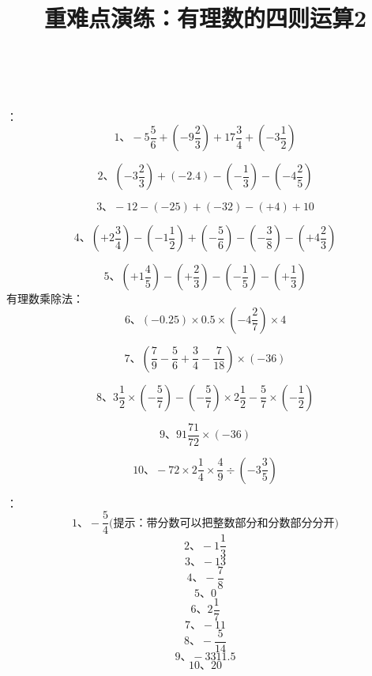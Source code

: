 \documentclass[fleqn]{article}
\title{重难点演练：有理数的四则运算2}
\date{}
\begin{document}
  \hspace{4cm}{\Large 重难点演练：有理数的四则运算2}
  \\
  \\
  
  ：\\
  \[\text{1、} -5\frac56+(-9\frac23)+17\frac34+(-3\frac12)\]
  
  \[\text{2、} (-3\frac23)+(-2.4)-(-\frac13)-(-4\frac25)\]
  
  \[\text{3、} -12-(-25)+(-32)-(+4)+10\]
  
  \[\text{4、} (+2\frac34)-(-1\frac12)+(-\frac56)-(-\frac38)-(+4\frac23)\]
  
  \[\text{5、} (+1\frac45)-(+\frac23)-(-\frac15)-(+\frac13)\]
  有理数乘除法：
  \[\text{6、} (-0.25)\times0.5\times(-4\frac27)\times4\]
  
  \[\text{7、} (\frac79-\frac56+\frac34-\frac7{18})\times(-36)\]
  
  \[\text{8、} 3\frac12\times(-\frac57)-(-\frac57)\times2\frac12-\frac57\times(-\frac12)\]
  
  \[\text{9、} 91\frac{71}{72}\times(-36)\]
  
  \[\text{10、} -72\times2\frac14\times\frac49\div(-3\frac35)\]
    
    \newpage
    ：
    \[\text{1、} -\frac54\text{(提示：带分数可以把整数部分和分数部分分开)}\]
    \[\text{2、} -1\frac13\]
    \[\text{3、} -13\]
    \[\text{4、} -\frac78\]
    \[\text{5、} 0\]
    \[\text{6、} 2\frac17\]
    \[\text{7、} -11\]
    \[\text{8、} -\frac5{14}\]
    \[\text{9、} -3311.5\]
    \[\text{10、} 20\]
\end{document}
